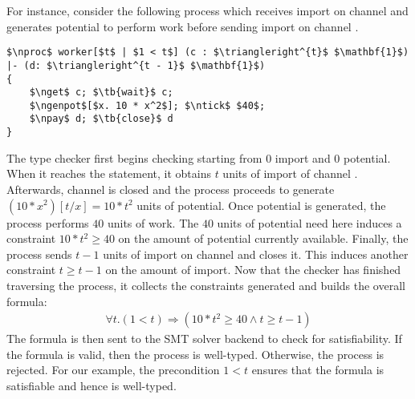 For instance, consider the following  process which receives import on channel  and generates potential to perform work before sending import on channel .
\begin{lstlisting}[basicstyle=\footnotesize\BeraMonottFamily, frame=single,  mathescape]
$\nproc$ worker[$t$ | $1 < t$] (c : $\triangleright^{t}$ $\mathbf{1}$) |- (d: $\triangleright^{t - 1}$ $\mathbf{1}$) 
{
    $\nget$ c; $\tb{wait}$ c;
    $\ngenpot$[$x. 10 * x^2$]; $\ntick$ $40$;
    $\npay$ d; $\tb{close}$ d
}
\end{lstlisting}
The type checker first begins checking  starting from 0 import and 0 potential.
When it reaches the  statement, it obtains $t$ units of import of channel .
Afterwards, channel  is closed and the process proceeds to generate 
$(10 * x^2)[t/x] = 10 * t^2$ units of potential. Once potential is generated, the process
performs $40$ units of work. The $40$ units of potential need here induces a constraint $10 * t^2 \geq 40$
on the amount of potential currently available. Finally, the process sends $t-1$ units of import on channel 
 and closes it. This induces another constraint $t \geq t - 1$ on the amount of import. Now that
the checker has finished traversing the process, it collects the constraints generated and builds the
overall formula:
\begin{align*}
  \forall t. (1 < t) \Rightarrow (10 * t^2 \geq 40 \land t \geq t - 1) 
\end{align*}
The formula is then sent to the SMT solver backend to check for satisfiability. If the formula is valid, then
the process is well-typed. Otherwise, the process is rejected. For our example, the precondition $1 < t$ 
ensures that the formula is satisfiable and hence  is well-typed.

